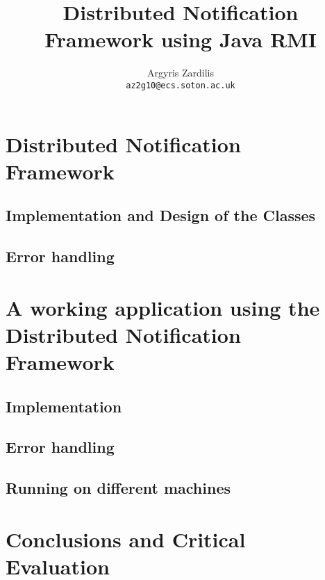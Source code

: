 \documentclass[a4paper,11pt,titlepage]{article}
\author{Argyris Zardilis\\ \texttt{az2g10@ecs.soton.ac.uk}}
\title{Distributed Notification Framework using Java RMI}
\begin{document}
\maketitle
\section{Distributed Notification Framework}
\subsection{Implementation and Design of the Classes}

\subsection{Error handling}
\section{A working application using the Distributed Notification Framework}
\subsection{Implementation}
\subsection{Error handling}
\subsection{Running on different machines}
\section{Conclusions and Critical Evaluation}
\end{document}
